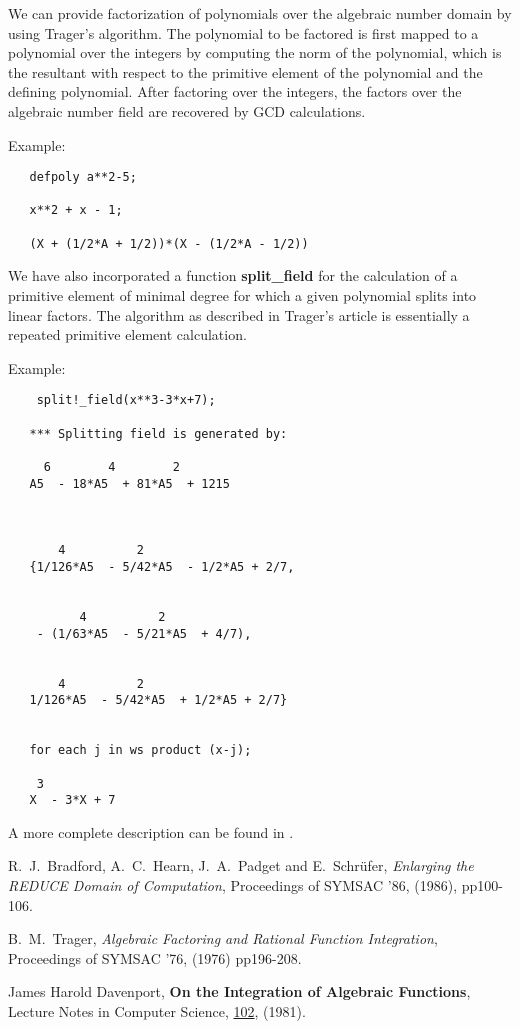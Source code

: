We can provide factorization of polynomials over the algebraic number
domain by using Trager's algorithm.  The polynomial to be factored is first
mapped to a polynomial over the integers by computing the norm of the
polynomial, which is the resultant with respect to the primitive element of
the polynomial and the defining polynomial.  After factoring over the
integers, the factors over the algebraic number field are recovered by GCD
calculations.

Example:
\begin{verbatim}
   defpoly a**2-5;

   x**2 + x - 1;

   (X + (1/2*A + 1/2))*(X - (1/2*A - 1/2))
\end{verbatim}
We have also incorporated a function {\bf split\_field} for the calculation of a
primitive element of minimal degree for which a given polynomial splits
into linear factors.  The algorithm as described in Trager's article is
essentially a repeated primitive element calculation.

Example:

\begin{verbatim}
    split!_field(x**3-3*x+7);

   *** Splitting field is generated by:

     6        4        2
   A5  - 18*A5  + 81*A5  + 1215



       4          2
   {1/126*A5  - 5/42*A5  - 1/2*A5 + 2/7,


          4          2
    - (1/63*A5  - 5/21*A5  + 4/7),


       4          2
   1/126*A5  - 5/42*A5  + 1/2*A5 + 2/7}


   for each j in ws product (x-j);

    3
   X  - 3*X + 7
\end{verbatim}

A more complete description can be found in \cite{Bradford:86}.

\begin{thebibliography}{9}

 R.~J.~Bradford, A.~C.~Hearn, J.~A.~Padget and
E.~Schr{\"u}fer, {\em Enlarging the REDUCE Domain of Computation},
Proceedings of SYMSAC '86, (1986), pp100-106.

 B.~M.~Trager, {\em Algebraic Factoring and
Rational Function Integration}, Proceedings of SYMSAC '76, (1976) pp196-208.

 James Harold Davenport, {\bf On the Integration
of Algebraic Functions}, Lecture Notes in Computer Science,
\underline{102}, (1981).

\end{thebibliography}



